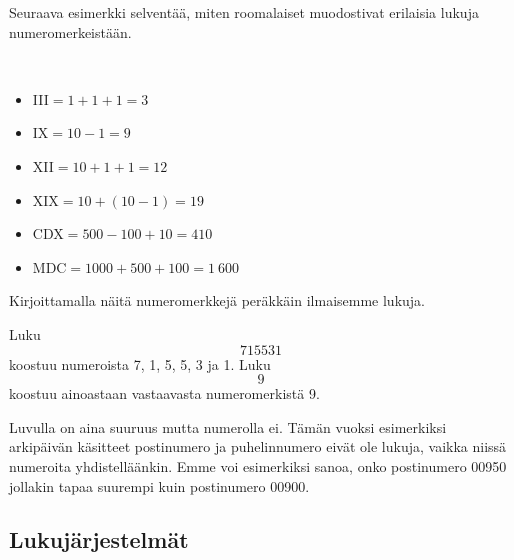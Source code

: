 Seuraava esimerkki selventää, miten roomalaiset muodostivat erilaisia lukuja numeromerkeistään.

\begin{esimerkki}
\ %
\begin{itemize} %
\item III$=1+1+1=3$
\item IX$=10-1=9$
\item XII$=10+1+1=12$
\item XIX$=10+(10-1)=19$
\item CDX$=500-100+10=410$
\item MDC$=1 000+500+100=1~600$
\end{itemize}
\end{esimerkki}


Kirjoittamalla näitä numeromerkkejä peräkkäin ilmaisemme lukuja.


\begin{esimerkki}
Luku \[715531\] koostuu numeroista 7, 1, 5, 5, 3 ja 1.
Luku \[9\] koostuu ainoastaan vastaavasta numeromerkistä 9.
\end{esimerkki}

Luvulla on aina suuruus mutta numerolla ei. Tämän vuoksi esimerkiksi arkipäivän käsitteet postinumero ja puhelinnumero eivät ole lukuja, vaikka niissä numeroita yhdistelläänkin. Emme voi esimerkiksi sanoa, onko postinumero 00950 jollakin tapaa suurempi kuin postinumero 00900.

\subsection*{Lukujärjestelmät}


